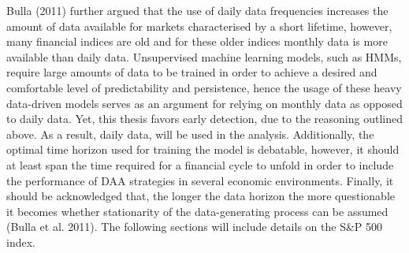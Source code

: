 Bulla (2011) further argued that the use of daily data frequencies increases the amount of data available for markets characterised by a short lifetime, however, many financial indices are old and for these older indices monthly data is more available than daily data. Unsupervised machine learning models, such as HMMs, require large amounts of data to be trained in order to achieve a desired and comfortable level of predictability and persistence, hence the usage of these heavy data-driven models serves as an argument for relying on monthly data as opposed to daily data. Yet, this thesis favors early detection, due to the reasoning outlined above. As a result, daily data, will be used in the analysis. Additionally, the optimal time horizon used for training the model is debatable, however, it should at least span the time required for a financial cycle to unfold in order to include the performance of DAA strategies in several economic environments. Finally, it should be acknowledged that, the longer the data horizon the more questionable it becomes whether stationarity of the data-generating process can be assumed (Bulla et al. 2011). The following sections will include details on the S\&P 500 index.